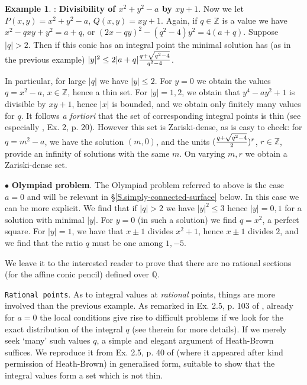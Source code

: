 \documentclass[leqno,12pt]{article} %
\def\Z{{{\mathbb Z}}}
\def\Q{{{\mathbb Q}}}
\theoremstyle{plain} %
\theoremstyle{definition} %
\newtheorem{example}[theorem]{\indent\sc Example}
\begin{document}
\begin{example}\label{EX.2}: {\bf Divisibility of $x^2+y^2-a$ by $xy+1$}. Now we let $P(x,y)=x^2+y^2-a$, $Q(x,y)=xy+1$. Again, if $q\in\Z$ is a value we have $x^2-qxy+y^2=a+q$, or $(2x-qy)^2-(q^2-4)y^2=4(a+q)$. Suppose $|q|>2$. Then if this conic has an integral point the minimal solution has (as in the previous example) $|y|^2\le 2 |a+q|{q+\sqrt{q^2-4}\over q^2-4}$. 

 In particular, for large $|q|$ we have $|y|\le 2$. For $y=0$ we obtain the values $q=x^2-a$, $x\in\Z$, hence a thin set. For $|y|=1,2$, we obtain that $y^4-ay^2+1$ is divisible by $xy+1$, hence $|x|$ is bounded, and we obtain only finitely many values for $q$.  It follows {\it a fortiori} that the set  of corresponding integral points is thin (see especially \cite{S}, Ex. 2, p. 20). However this set is Zariski-dense, as is easy to check: for $q=m^2-a$, we have the solution $(m,0)$,  and the units $({q+\sqrt{q^2-4}\over 2})^r$, $r\in\Z$, provide an infinity of solutions with the same $m$. On varying $m,r$ we obtain a Zariski-dense set. 
 
 \smallskip
 
 $\bullet$ {\bf Olympiad problem}. The Olympiad problem referred to above is the case $a=0$ and will be relevant in \S \ref{S.simply-connected-surface} below. In this case we can be more explicit.  We find that if $|q|>2$ we have $|y|^2\le 3$ hence $|y|=0,1$ for a  solution with minimal $|y|$.  For $y=0$ (in such a solution) we find $q=x^2$, a perfect square. For $|y|=1$, we have that $x\pm 1$ divides $x^2+1$, hence  $x\pm 1$ divides $2$, and we find that the ratio $q$ must be one among $1, - 5$. 
  
 

\smallskip

We leave it to the interested reader to prove that there are no rational sections (for the affine conic pencil) defined over $\Q$. 

\smallskip

{\tt Rational points}. As to integral values at {\it rational } points, things are more involved than the previous example.  As remarked in Ex. 2.5, p. 103 of \cite{Z2}, already for $a=0$  the local conditions give rise to difficult problems if we look for the exact distribution of the integral $q$ (see therein for more details). If we merely seek `many' such values $q$, a simple and elegant  argument of {\sc Heath-Brown} suffices. We reproduce it from Ex. 2.5, p. 40 of \cite{Z2} (where it appeared after kind permission of {\sc Heath-Brown}) in generalised form, suitable to show that the integral values form a set which is not thin.  


\end{example}
\end{document}
